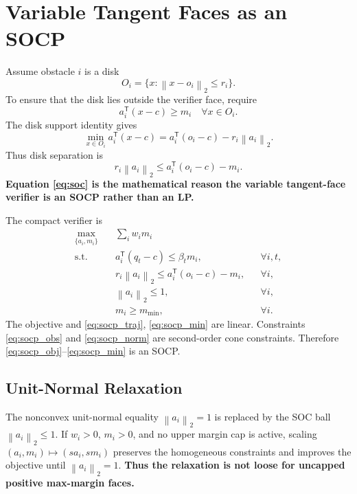 \documentclass[conference]{IEEEtran}
\newcommand{\norm}[1]{\left\lVert #1\right\rVert_2}
\newcommand{\trans}{^{\mathsf T}}
\begin{document}
\section{Variable Tangent Faces as an SOCP}
Assume obstacle $i$ is a disk
\begin{equation}
    O_i=\{x:\norm{x-o_i}\le r_i\}.
\end{equation}
To ensure that the disk lies outside the verifier face, require
\begin{equation}
    a_i\trans(x-c)\ge m_i\quad\forall x\in O_i.
\end{equation}
The disk support identity gives
\begin{equation}
    \min_{x\in O_i}a_i\trans(x-c)=a_i\trans(o_i-c)-r_i\norm{a_i}.
\end{equation}
Thus disk separation is
\begin{equation}
    r_i\norm{a_i}\le a_i\trans(o_i-c)-m_i.
    \label{eq:soc}
\end{equation}
\textbf{Equation \eqref{eq:soc} is the mathematical reason the variable tangent-face verifier is an SOCP rather than an LP.}

The compact verifier is
\begin{align}
    \max_{\{a_i,m_i\}}\quad
    &\sum_i w_i m_i \label{eq:socp_obj}\\
    \text{s.t.}\quad
    &a_i\trans(q_t-c)\le\beta_t m_i, &&\forall i,t,\label{eq:socp_traj}\\
    &r_i\norm{a_i}\le a_i\trans(o_i-c)-m_i, &&\forall i,\label{eq:socp_obs}\\
    &\norm{a_i}\le1, &&\forall i,\label{eq:socp_norm}\\
    &m_i\ge m_{\min}, &&\forall i.\label{eq:socp_min}
\end{align}
The objective and \eqref{eq:socp_traj}, \eqref{eq:socp_min} are linear.  Constraints \eqref{eq:socp_obs} and \eqref{eq:socp_norm} are second-order cone constraints. Therefore \eqref{eq:socp_obj}--\eqref{eq:socp_min} is an SOCP.

\subsection{Unit-Normal Relaxation}
The nonconvex unit-normal equality $\norm{a_i}=1$ is replaced by the SOC ball $\norm{a_i}\le1$.  If $w_i>0$, $m_i>0$, and no upper margin cap is active, scaling $(a_i,m_i)\mapsto(s a_i,s m_i)$ preserves the homogeneous constraints and improves the objective until $\norm{a_i}=1$. \textbf{Thus the relaxation is not loose for uncapped positive max-margin faces.}
\end{document}
